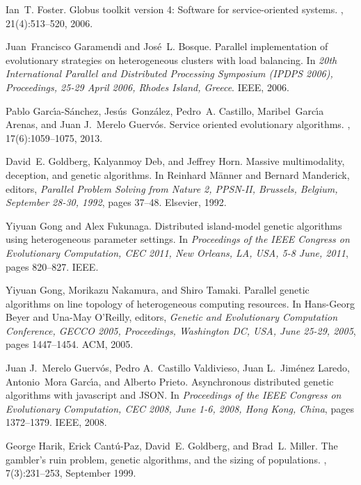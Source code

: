\documentclass[final,1p,times]{elsarticle}
\begin{document}
\begin{thebibliography}{10}
Ian~T. Foster.
\newblock Globus toolkit version 4: Software for service-oriented systems.
, 21(4):513--520, 2006.

Juan~Francisco Garamendi and Jos{\'{e}}~L. Bosque.
\newblock Parallel implementation of evolutionary strategies on heterogeneous
  clusters with load balancing.
\newblock In {\em 20th International Parallel and Distributed Processing
  Symposium {(IPDPS} 2006), Proceedings, 25-29 April 2006, Rhodes Island,
  Greece}. {IEEE}, 2006.

Pablo Garc{\'{\i}}a{-}S{\'{a}}nchez, Jes{\'{u}}s~Gonz{\'{a}}lez, Pedro~A. Castillo,
  Maribel~Garc{\'{\i}}a Arenas, and Juan J.~Merelo Guerv{\'{o}}s.
\newblock Service oriented evolutionary algorithms.
, 17(6):1059--1075, 2013.

David~E. Goldberg, Kalyanmoy Deb, and Jeffrey Horn.
\newblock Massive multimodality, deception, and genetic algorithms.
\newblock In Reinhard M{\"{a}}nner and Bernard Manderick, editors, {\em
  Parallel Problem Solving from Nature 2, PPSN-II, Brussels, Belgium, September
  28-30, 1992}, pages 37--48. Elsevier, 1992.

Yiyuan Gong and Alex Fukunaga.
\newblock Distributed island-model genetic algorithms using heterogeneous
  parameter settings.
\newblock In {\em Proceedings of the {IEEE} Congress on Evolutionary
  Computation, {CEC} 2011, New Orleans, LA, USA, 5-8 June, 2011}, pages
  820--827. {IEEE}.

Yiyuan Gong, Morikazu Nakamura, and Shiro Tamaki.
\newblock Parallel genetic algorithms on line topology of heterogeneous
  computing resources.
\newblock In Hans{-}Georg Beyer and Una{-}May O'Reilly, editors, {\em Genetic
  and Evolutionary Computation Conference, {GECCO} 2005, Proceedings,
  Washington DC, USA, June 25-29, 2005}, pages 1447--1454. {ACM}, 2005.

Juan J.~Merelo Guerv{\'{o}}s, Pedro A.~Castillo Valdivieso, Juan
  L.~Jim{\'{e}}nez Laredo, Antonio~Mora Garc{\'{\i}}a, and Alberto
  Prieto.
\newblock Asynchronous distributed genetic algorithms with javascript and
  {JSON}.
\newblock In {\em Proceedings of the {IEEE} Congress on Evolutionary
  Computation, {CEC} 2008, June 1-6, 2008, Hong Kong, China}, pages 1372--1379.
  {IEEE}, 2008.

George Harik, Erick Cant\'{u}-Paz, David~E. Goldberg, and Brad~L. Miller.
\newblock The gambler's ruin problem, genetic algorithms, and the sizing of
  populations.
, 7(3):231--253, September 1999.


\end{thebibliography}
\end{document}
